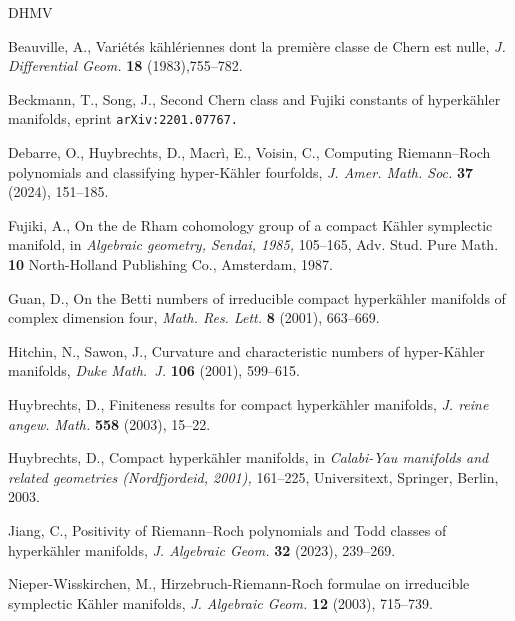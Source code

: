 \documentclass[12pt]{amsart}
\theoremstyle{remark}
\begin{document}
 
 
 \begin{thebibliography}{DHMV}
 
  Beauville, A., Vari\'et\'es k\"ahl\'eriennes dont la premi\`ere classe de Chern est
nulle, {\em J. Differential Geom.} {\bf18} (1983),755--782. 
 
 
     Beckmann, T., Song, J.,
   Second Chern class and Fujiki constants of hyperk\"ahler manifolds, eprint {\tt arXiv:2201.07767.}
 
   Debarre,  O., Huybrechts, D.,  Macr\`i, E.,   Voisin, C., Computing Riemann--Roch polynomials and classifying hyper-K\"ahler fourfolds, {\em J. Amer. Math. Soc.} {\bf37}  (2024), 151--185. 
  
    Fujiki, A., 
On the de Rham cohomology group of a compact K\"ahler symplectic manifold, in {\em Algebraic geometry, Sendai, 1985,} 105--165, Adv. Stud. Pure Math. {\bf10}
North-Holland Publishing Co., Amsterdam, 1987.


  
Guan, D., On the Betti numbers of irreducible compact hyperk\"ahler manifolds of complex dimension four, {\em Math. Res. Lett.} {\bf8} (2001),   663--669.
 
  Hitchin, N., Sawon, J., Curvature and characteristic numbers of hyper-K\"ahler manifolds, {\it Duke Math.~J.} {\bf 106} (2001), 599--615.

 Huybrechts, D.,
Finiteness results for compact hyperk\"ahler manifolds, {\it J. reine angew. Math.} {\bf558} (2003), 15--22. 

 Huybrechts, D., Compact hyperk\"ahler manifolds, in {\em Calabi-Yau manifolds and related geometries (Nordfjordeid, 2001),} 161--225, Universitext, Springer, Berlin, 2003.
 
  Jiang, C., Positivity of Riemann--Roch polynomials and Todd classes of hyperk\"ahler manifolds, {\em J. Algebraic Geom.} {\bf32} (2023),  239--269.

 
  Nieper-Wisskirchen, M., Hirzebruch-Riemann-Roch formulae on irreducible symplectic K\"ahler manifolds, {\em J. Algebraic Geom.} {\bf12} (2003),  715--739.


 \end{thebibliography}
\end{document}
